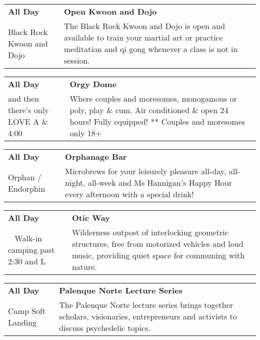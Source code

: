 \begin{tabular}{ p{1in} p{2.2in} }
    \textbf{All Day} & \textbf{Open Kwoon and Dojo} \\
    Black Rock Kwoon and Dojo \newline  & The Black Rock Kwoon and Dojo is open and available to train your martial art or practice meditation and qi gong whenever a class is not in session. \\
    \hline 
\end{tabular}
    
\begin{tabular}{ p{1in} p{2.2in} }
    \textbf{All Day} & \textbf{Orgy Dome} \\
    and then there's only LOVE \newline A \& 4:00 & Where couples and moresomes, monogamous or poly, play \& cum.  Air conditioned \& open 24 hours! Fully equipped! ** Couples and moresomes only 18+ \\
    \hline 
\end{tabular}
    
\begin{tabular}{ p{1in} p{2.2in} }
    \textbf{All Day} & \textbf{Orphanage Bar} \\
    Orphan / Endorphin \newline  & Microbrews for your leisurely pleasure all-day, all-night, all-week and Ms Hannigan's Happy Hour every afternoon with a special drink! \\
    \hline 
\end{tabular}
    
\begin{tabular}{ p{1in} p{2.2in} }
    \textbf{All Day} & \textbf{Otic Way} \\
    ~ \newline Walk-in camping past 2:30 and L & Wilderness outpost of interlocking geometric structures, free from motorized vehicles and loud music, providing quiet space for communing with nature. \\
    \hline 
\end{tabular}
    
\begin{tabular}{ p{1in} p{2.2in} }
    \textbf{All Day} & \textbf{Palenque Norte Lecture Series} \\
    Camp Soft Landing \newline  & The Palenque Norte lecture series brings together scholars, visionaries, entrepreneurs and activists to discuss psychedelic topics. \\
    \hline 
\end{tabular}
    
